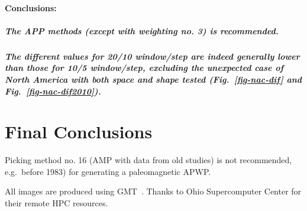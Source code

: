\paragraph{Conclusions:}

\subparagraph{The APP methods (except with weighting no. 3) is recommended.}

\subparagraph{The different values for 20/10 window/step are indeed generally
lower than those for 10/5 window/step, excluding the unexpected case of North
America with both space and shape tested (Fig.~\ref{fig-nac-dif} and
Fig.~\ref{fig-nac-dif2010}).}


\section{Final Conclusions}

\begin{description}
  \item Picking method no. 16 (AMP with data from old studies) is not
		recommended, e.g.\ before 1983) for generating a paleomagnetic APWP.
\end{description}


\begin{acknowledgments}
All images are produced using GMT~\cite{W13}. Thanks to Ohio Supercomputer
Center for their remote HPC resources.
\end{acknowledgments}

